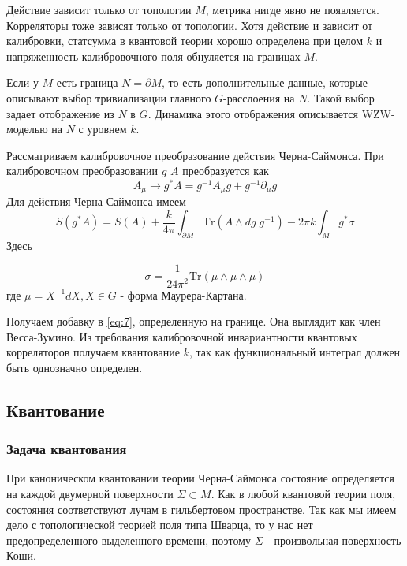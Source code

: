 \documentclass[a4paper,12pt]{article}
\theoremstyle{definition} \newtheorem{Def}{Definition}
\begin{document}
Действие зависит только от топологии $M$, метрика нигде явно не появляется. Корреляторы тоже зависят только от топологии. 
Хотя действие и зависит от калибровки, статсумма в квантовой теории хорошо определена при целом $k$ и напряженность калибровочного поля обнуляется на границах $M$.

Если у $M$ есть граница $N=\partial M$, то есть дополнительные данные, которые описывают выбор тривиализации главного $G$-расслоения на $N$. Такой выбор задает отображение из $N$ в $G$. Динамика этого отображения описывается WZW-моделью на $N$ с уровнем $k$.  

Рассматриваем калибровочное преобразование действия Черна-Саймонса.
При калибровочном преобразовании $g$ $A$ преобразуется как
\begin{equation}
  \label{eq:5}
  A_{\mu}\to g^* A= g^{-1}A_{\mu}g+g^{-1}\partial_{\mu}g
\end{equation}
Для действия Черна-Саймонса имеем
\begin{equation}
  \label{eq:7}
  S(g^* A)=S(A) +\frac{k}{4\pi}\int_{\partial M}\mathrm{Tr} (A\wedge dg \; g^{-1})-2\pi k\int_M g^* \sigma
\end{equation}
Здесь 

\begin{equation}
  \label{eq:4}
  \sigma=\frac{1}{24\pi^2} \mathrm{Tr} (\mu\wedge\mu\wedge\mu)
\end{equation}
где $\mu=X^{-1} dX, X\in G$ - форма Маурера-Картана. 

Получаем добавку в \eqref{eq:7}, определенную на границе. Она выглядит как член Весса-Зумино. Из требования калибровочной инвариантности квантовых корреляторов  получаем квантование $k$, так как функциональный интеграл должен быть однозначно определен. 

\subsection{Квантование}
\label{sec:quantization}

\subsubsection{Задача квантования}
\label{sec:task}

При каноническом квантовании теории Черна-Саймонса состояние определяется на каждой двумерной поверхности $\Sigma\subset M$. Как в любой квантовой теории поля, состояния соответствуют лучам в гильбертовом пространстве. Так как мы имеем дело с топологической теорией поля типа Шварца, то у нас нет предопределенного выделенного времени, поэтому $\Sigma$ - произвольная поверхность Коши.
\end{document}
